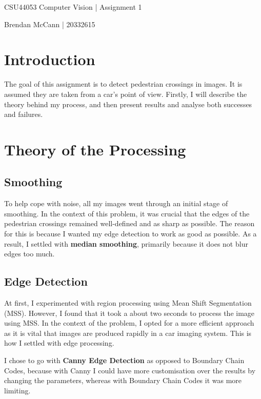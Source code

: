 \documentclass{article}  %
\begin{document}
	
	\begin{center}
		\begin{Large}
			CSU44053 Computer Vision | Assignment 1
			
			Brendan McCann | 20332615
		\end{Large}
	\end{center}
	
	\section*{Introduction}
	
	The goal of this assignment is to detect pedestrian crossings in images. It is assumed they are taken from a car's point of view. Firstly, I will describe the theory behind my process, and then present results and analyse both successes and failures.
	
	\section{Theory of the Processing}
	
	\subsection{Smoothing}
	
	To help cope with noise, all my images went through an initial stage of smoothing. In the context of this problem, it was crucial that the edges of the pedestrian crossings remained well-defined and as sharp as possible. The reason for this is because I wanted my edge detection to work as good as possible. As a result, I settled with \textbf{median smoothing}, primarily because it does not blur edges too much.
	
	\subsection{Edge Detection}
	
	At first, I experimented with region processing using Mean Shift Segmentation (MSS). However, I found that it took a about two seconds to process the image using MSS. In the context of the problem, I opted for a more efficient approach as it is vital that images are produced rapidly in a car imaging system. This is how I settled with edge processing.
	
	I chose to go with \textbf{Canny Edge Detection} as opposed to Boundary Chain Codes, because with Canny I could have more customisation over the results by changing the parameters, whereas with Boundary Chain Codes it was more limiting.
	
\end{document}

